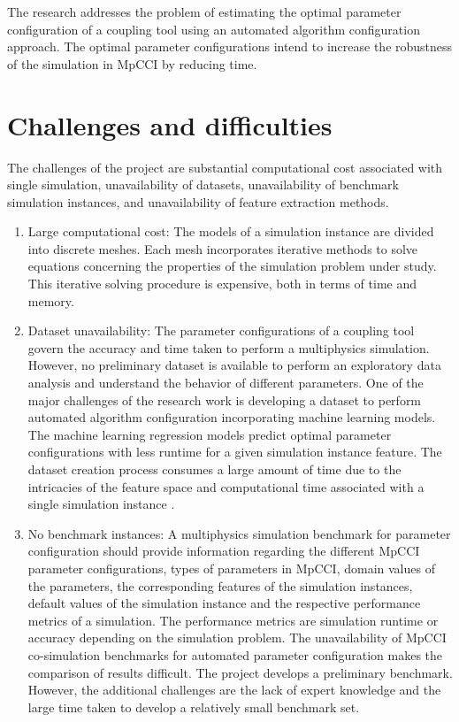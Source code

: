 The research addresses the problem of estimating the optimal parameter configuration of a coupling tool using an automated algorithm configuration approach. The optimal parameter configurations intend to increase the robustness of the simulation in MpCCI by reducing time.
 
\section{Challenges and difficulties}
The challenges of the project are substantial computational cost associated with single simulation, unavailability of datasets, unavailability of benchmark simulation instances, and unavailability of feature extraction methods.

\begin{enumerate}
\item Large computational cost: The models of a simulation instance are divided into discrete meshes. Each mesh incorporates iterative methods to solve equations concerning the properties of the simulation problem under study. This iterative solving procedure is expensive, both in terms of time and memory.


\item Dataset unavailability: The parameter configurations of a coupling tool govern the accuracy and time taken to perform a multiphysics simulation. However, no preliminary dataset is available to perform an exploratory data analysis and understand the behavior of different parameters. One of the major challenges of the research work is developing a dataset to perform automated algorithm configuration incorporating machine learning models. The machine learning regression models predict optimal parameter configurations with less runtime for a given simulation instance feature. The dataset creation process consumes a large amount of time due to the intricacies of the feature space and computational time associated with a single simulation instance \cite{EGO_Basepaper} \cite{aerodynamics_time}.

\item No benchmark instances: A multiphysics simulation benchmark for parameter configuration should provide information regarding the different MpCCI parameter configurations, types of parameters in MpCCI, domain values of the parameters, the corresponding features of the simulation instances, default values of the simulation instance and the respective performance metrics of a simulation. The performance metrics are simulation runtime or accuracy depending on the simulation problem. The unavailability of MpCCI co-simulation benchmarks for automated parameter configuration makes the comparison of results difficult. The project develops a preliminary benchmark. However, the additional challenges are the lack of expert knowledge and the large time taken to develop a relatively small benchmark set.


\end{enumerate}
